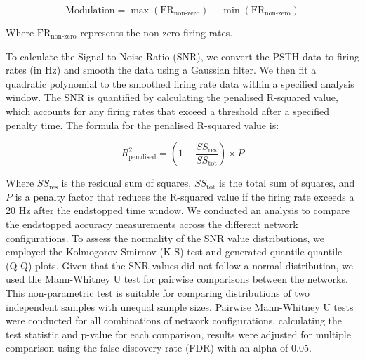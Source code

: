 \documentclass[12pt]{article}
\begin{document}
\[
\text{Modulation} = \max(\text{FR}_{\text{non-zero}}) - \min(\text{FR}_{\text{non-zero}})
\]

Where \(\text{FR}_{\text{non-zero}}\) represents the non-zero firing rates.

To calculate the Signal-to-Noise Ratio (SNR), we convert the PSTH data to firing rates (in Hz) and smooth the data using a Gaussian filter. We then fit a quadratic polynomial to the smoothed firing rate data within a specified analysis window. The SNR is quantified by calculating the penalised R-squared value, which accounts for any firing rates that exceed a threshold after a specified penalty time. The formula for the penalised R-squared value is:

\[
R^2_{\text{penalised}} = \left( 1 - \frac{SS_{\text{res}}}{SS_{\text{tot}}} \right) \times P
\]

Where \(SS_{\text{res}}\) is the residual sum of squares, \(SS_{\text{tot}}\) is the total sum of squares, and \(P\) is a penalty factor that reduces the R-squared value if the firing rate exceeds a 20 Hz after the endstopped time window. We conducted an analysis to compare the endstopped accuracy measurements across the different network configurations. To assess the normality of the SNR value distributions, we employed the Kolmogorov-Smirnov (K-S) test and generated quantile-quantile (Q-Q) plots. Given that the SNR values did not follow a normal distribution, we used the Mann-Whitney U test for pairwise comparisons between the networks. This non-parametric test is suitable for comparing distributions of two independent samples with unequal sample sizes. Pairwise Mann-Whitney U tests were conducted for all combinations of network configurations, calculating the test statistic and p-value for each comparison, results were adjusted for multiple comparison using the false discovery rate (FDR) with an alpha of 0.05.
 
\newpage
\end{document}
